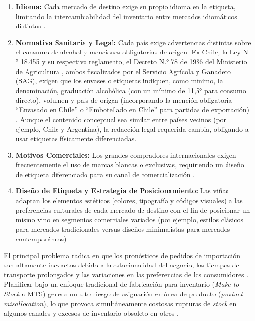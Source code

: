 \begin{enumerate}
    \item \textbf{Idioma:} Cada mercado de destino exige su propio idioma en la etiqueta, limitando la intercambiabilidad del inventario entre mercados idiomáticos distintos \cite{bouzdine2011}.
    \item \textbf{Normativa Sanitaria y Legal:} Cada país exige advertencias distintas sobre el consumo de alcohol y menciones obligatorias de origen. En Chile, la Ley N.° 18.455 \cite{minagri1985} y su respectivo reglamento, el Decreto N.° 78 de 1986 del Ministerio de Agricultura \cite{minagri1986}, ambos fiscalizados por el Servicio Agrícola y Ganadero (SAG), exigen que los envases o etiquetas indiquen, como mínimo, la denominación, graduación alcohólica (con un mínimo de 11,5° para consumo directo), volumen y país de origen (incorporando la mención obligatoria ``Envasado en Chile'' o ``Embotellado en Chile'' para partidas de exportación) \cite{minagri1985}. Aunque el contenido conceptual sea similar entre países vecinos (por ejemplo, Chile y Argentina), la redacción legal requerida cambia, obligando a usar etiquetas físicamente diferenciadas.
    \item \textbf{Motivos Comerciales:} Los grandes compradores internacionales exigen frecuentemente el uso de marcas blancas o exclusivas, requiriendo un diseño de etiqueta diferenciado para su canal de comercialización \cite{bouzdine2011}.
    \item \textbf{Diseño de Etiqueta y Estrategia de Posicionamiento:} Las viñas adaptan los elementos estéticos (colores, tipografía y códigos visuales) a las preferencias culturales de cada mercado de destino con el fin de posicionar un mismo vino en segmentos comerciales variados (por ejemplo, estilos clásicos para mercados tradicionales versus diseños minimalistas para mercados contemporáneos) \cite{cholette2009}.
\end{enumerate}
El principal problema radica en que los pronósticos de pedidos de importación son altamente inexactos debido a la estacionalidad del negocio, los tiempos de transporte prolongados y las variaciones en las preferencias de los consumidores \cite{cholette2009, varas2018}. Planificar bajo un enfoque tradicional de fabricación para inventario (\textit{Make-to-Stock} o MTS) genera un alto riesgo de asignación errónea de producto (\textit{product misallocation}), lo que provoca simultáneamente costosas rupturas de \textit{stock} en algunos canales y excesos de inventario obsoleto en otros \cite{cholette2009, varas2018}.

